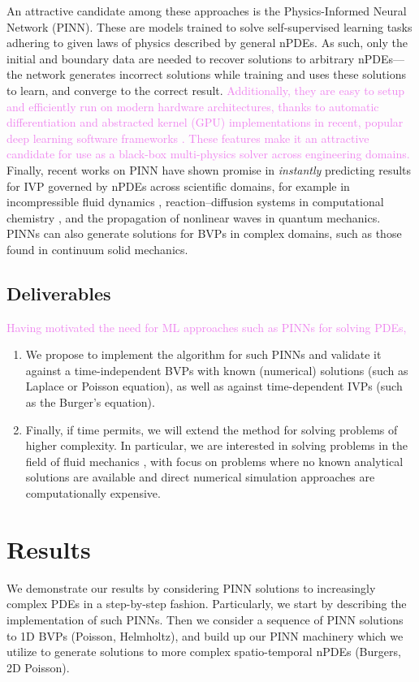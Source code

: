 \documentclass[11pt]{article}
\newcommand{\newcontent}[1]{\textcolor{violet}{#1}}
\begin{document}
An attractive candidate among these approaches is the Physics-Informed Neural
Network (PINN). These are models trained to solve self-supervised learning
tasks adhering to given laws of physics \cite{raissi2019physics} described
by general nPDEs. As such, only the initial and boundary data are needed to
recover solutions to arbitrary nPDEs---the network generates incorrect
solutions while training and uses these solutions to learn, and
converge to the correct result.
\newcontent{
Additionally, they are easy to setup and efficiently run on modern hardware architectures,
thanks to automatic differentiation and abstracted kernel (GPU) implementations in
recent, popular deep learning software frameworks \cite{paszke2019pytorch}.
These features make it an attractive candidate for use as a black-box
multi-physics solver across engineering domains.
}
Finally, recent works on PINN have shown promise in
\emph{instantly} predicting results for IVP governed by nPDEs across
scientific domains, for example in
incompressible fluid dynamics \cite{jin2020nsfnets,raissi2020hidden}, reaction--diffusion systems in
computational chemistry \cite{raissi2019physics}, and the propagation of nonlinear
waves in quantum mechanics. PINNs can also generate solutions for
BVPs in complex domains, such as those found in continuum
solid mechanics.

\subsection{Deliverables}
\label{sec:org79d77c0}
\newcontent{
Having motivated the need for ML approaches such as PINNs for solving PDEs,
}
\begin{enumerate}
\item We propose to implement the algorithm for such PINNs and validate it
against a time-independent BVPs with known (numerical) solutions (such as
Laplace or Poisson equation), as well as against time-dependent IVPs (such
as the Burger’s equation).
\item Finally, if time permits, we will extend the method for solving problems
of higher complexity. In particular, we are interested in solving problems
in the field of fluid mechanics \cite{jin2020nsfnets,raissi2020hidden}, with
focus on problems where no known analytical solutions are available
and direct numerical simulation approaches are computationally expensive.
\end{enumerate}

\section{Results}
\label{sec:orgb45679f}
We demonstrate our results by considering PINN solutions to increasingly
complex PDEs in a step-by-step fashion. Particularly, we start by
describing the implementation of such PINNs. Then we consider a sequence of
PINN solutions to 1D BVPs (Poisson, Helmholtz), and build up our PINN machinery
which we utilize to generate solutions to more complex spatio-temporal nPDEs
(Burgers, 2D Poisson).
\end{document}
